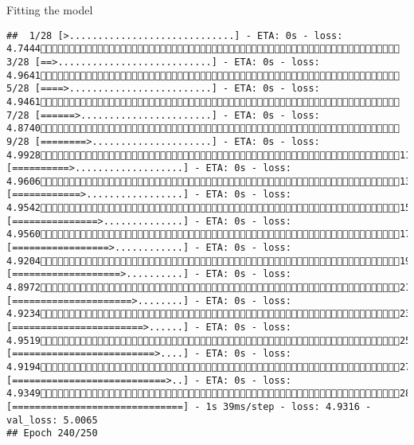 \documentclass[
  ignorenonframetext,
]{beamer}
\begin{document}
\begin{frame}[fragile]{Fitting the model}
\begin{verbatim}
##  1/28 [>.............................] - ETA: 0s - loss: 4.7444 3/28 [==>...........................] - ETA: 0s - loss: 4.9641 5/28 [====>.........................] - ETA: 0s - loss: 4.9461 7/28 [======>.......................] - ETA: 0s - loss: 4.8740 9/28 [========>.....................] - ETA: 0s - loss: 4.992811/28 [==========>...................] - ETA: 0s - loss: 4.960613/28 [============>.................] - ETA: 0s - loss: 4.954215/28 [===============>..............] - ETA: 0s - loss: 4.956017/28 [=================>............] - ETA: 0s - loss: 4.920419/28 [===================>..........] - ETA: 0s - loss: 4.897221/28 [=====================>........] - ETA: 0s - loss: 4.923423/28 [=======================>......] - ETA: 0s - loss: 4.951925/28 [=========================>....] - ETA: 0s - loss: 4.919427/28 [===========================>..] - ETA: 0s - loss: 4.934928/28 [==============================] - 1s 39ms/step - loss: 4.9316 - val_loss: 5.0065
## Epoch 240/250

\end{verbatim}
\end{frame}
\end{document}
